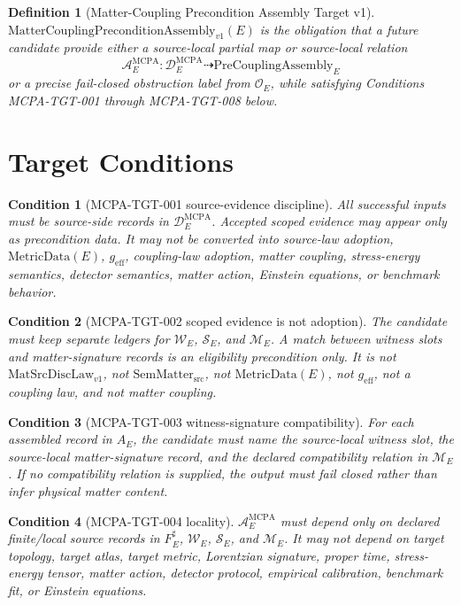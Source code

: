 \documentclass[11pt]{article}
\newcommand{\MetricData}{\mathrm{MetricData}}
\newcommand{\geff}{g_{\mathrm{eff}}}
\newcommand{\MatSrcDiscLaw}{\mathrm{MatSrcDiscLaw}_{v1}}
\newcommand{\SemMatterSrc}{\mathrm{SemMatter}_{\mathrm{src}}}
\newcommand{\MCPA}{\mathrm{MatterCouplingPreconditionAssembly}_{v1}}
\newcommand{\PreCoupAsm}{\mathrm{PreCouplingAssembly}}
\newtheorem{definition}{Definition}
\newtheorem{condition}{Condition}
\begin{document}
\begin{definition}[Matter-Coupling Precondition Assembly Target v1]
\(\MCPA(E)\) is the obligation that a future candidate provide either a
source-local partial map or source-local relation
\[
  \mathcal{A}^{\mathrm{MCPA}}_E:
  \mathcal{D}^{\mathrm{MCPA}}_E \dashrightarrow \PreCoupAsm_E
\]
or a precise fail-closed obstruction label from \(\mathcal{O}_E\), while
satisfying Conditions MCPA-TGT-001 through MCPA-TGT-008 below.
\end{definition}

\section{Target Conditions}

\begin{condition}[MCPA-TGT-001 source-evidence discipline]
All successful inputs must be source-side records in
\(\mathcal{D}^{\mathrm{MCPA}}_E\). Accepted scoped evidence may appear only as
precondition data. It may not be converted into source-law adoption,
\(\MetricData(E)\), \(\geff\), coupling-law adoption, matter coupling,
stress-energy semantics, detector semantics, matter action, Einstein
equations, or benchmark behavior.
\end{condition}

\begin{condition}[MCPA-TGT-002 scoped evidence is not adoption]
The candidate must keep separate ledgers for \(\mathcal{W}_E\),
\(\mathcal{S}_E\), and \(\mathcal{M}_E\). A match between witness slots and
matter-signature records is an eligibility precondition only. It is not
\(\MatSrcDiscLaw\), not \(\SemMatterSrc\), not \(\MetricData(E)\), not
\(\geff\), not a coupling law, and not matter coupling.
\end{condition}

\begin{condition}[MCPA-TGT-003 witness-signature compatibility]
For each assembled record in \(A_E\), the candidate must name the
source-local witness slot, the source-local matter-signature record, and the
declared compatibility relation in \(\mathcal{M}_E\). If no compatibility
relation is supplied, the output must fail closed rather than infer physical
matter content.
\end{condition}

\begin{condition}[MCPA-TGT-004 locality]
\(\mathcal{A}^{\mathrm{MCPA}}_E\) must depend only on declared finite/local
source records in \(F_E^\sharp\), \(\mathcal{W}_E\), \(\mathcal{S}_E\), and
\(\mathcal{M}_E\). It may not depend on target topology, target atlas, target
metric, Lorentzian signature, proper time, stress-energy tensor, matter
action, detector protocol, empirical calibration, benchmark fit, or Einstein
equations.
\end{condition}
\end{document}
